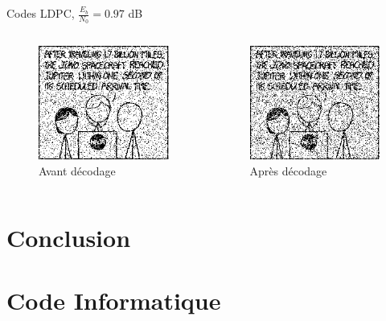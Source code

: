 \documentclass[11pt]{beamer}
\begin{document}
\begin{frame}{Codes LDPC, $\frac{E_b}{N_0} = 0.97$ dB}
	\begin{columns}
		\begin{column}{.5\textwidth}
			\begin{figure}
				\includegraphics[scale=0.6]{ldpc_basic_noisy_80}\\
				Avant d\'ecodage
			\end{figure}
		\end{column}
		\begin{column}{.5\textwidth}
			\begin{figure}
				\includegraphics[scale=0.6]{ldpc_basic_decoded_80}\\
				Apr\`es d\'ecodage
			\end{figure}
		\end{column}
	\end{columns}
\end{frame}


\section*{Conclusion}



\appendix



\section{Code Informatique}
\end{document}
